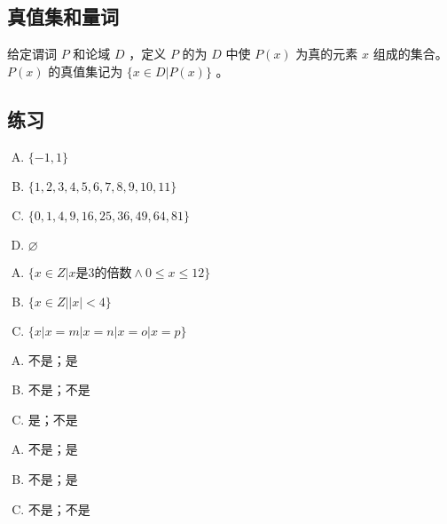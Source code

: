 {    \subsection{真值集和量词}
    {
        给定谓词 $P$ 和论域 $D$ ，定义 $P$ 的为 $D$ 中使 $P(x)$ 为真的元素 $x$ 组成的集合。
        $P(x)$ 的真值集记为 $\{x \in D | P(x)\}$ 。
    }

    \subsection{练习}
    {
        \begin{practices}
            \begin{enumerate}[A.]
                \item $\{-1, 1\}$
                \item $\{1, 2, 3, 4, 5, 6, 7, 8, 9, 10, 11\}$
                \item $\{0, 1, 4, 9, 16, 25, 36, 49, 64, 81\}$
                \item $\varnothing$
            \end{enumerate}
        \end{practices}

        \begin{practices}
            \begin{enumerate}[A.]
                \item $\{x \in Z | x \text{是} 3 \text{的倍数} \wedge 0 \leq x \leq 12\}$
                \item $\{x \in Z | |x| < 4\}$
                \item $\{x | x = m | x = n | x = o | x = p\}$
            \end{enumerate}
        \end{practices}

        \begin{practices}
            \begin{enumerate}[A.]
                \item 不是；是
                \item 不是；不是
                \item 是；不是
            \end{enumerate}
        \end{practices}

        \begin{practices}
            \begin{enumerate}[A.]
                \item 不是；是
                \item 不是；是
                \item 不是；不是
            \end{enumerate}
        \end{practices}

}}
